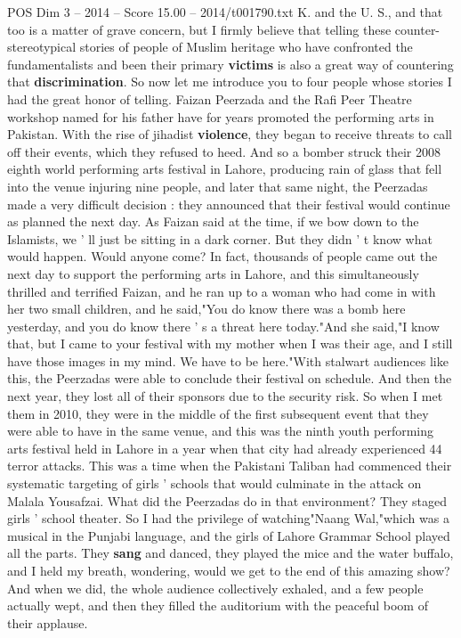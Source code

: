 \begin{textsample}{POS Dim 3 – 2014 – Score 15.00 – 2014/t001790.txt}
K. and the U.
S., and that too is a matter of grave concern, but I firmly believe that telling these counter- stereotypical stories of people of Muslim heritage who have confronted the fundamentalists and been their primary \textbf{victims} is also a great way of countering that \textbf{discrimination}.
So now let me introduce you to four people whose stories I had the great honor of telling.
Faizan Peerzada and the Rafi Peer Theatre workshop named for his father have for years promoted the performing arts in Pakistan.
With the rise of jihadist \textbf{violence}, they began to receive threats to call off their events, which they refused to heed.
And so a bomber struck their 2008 eighth world performing arts festival in Lahore, producing rain of glass that fell into the venue injuring nine people, and later that same night, the Peerzadas made a very difficult decision : they announced that their festival would continue as planned the next day.
As Faizan said at the time, if we bow down to the Islamists, we ' ll just be sitting in a dark corner.
But they didn ' t know what would happen.
Would anyone come?
In fact, thousands of people came out the next day to support the performing arts in Lahore, and this simultaneously thrilled and terrified Faizan, and he ran up to a woman who had come in with her two small children, and he said,"You do know there was a bomb here yesterday, and you do know there ' s a threat here today."And she said,"I know that, but I came to your festival with my mother when I was their age, and I still have those images in my mind.
We have to be here."With stalwart audiences like this, the Peerzadas were able to conclude their festival on schedule.
And then the next year, they lost all of their sponsors due to the security risk.
So when I met them in 2010, they were in the middle of the first subsequent event that they were able to have in the same venue, and this was the ninth youth performing arts festival held in Lahore in a year when that city had already experienced 44 terror attacks.
This was a time when the Pakistani Taliban had commenced their systematic targeting of girls ' schools that would culminate in the attack on Malala Yousafzai.
What did the Peerzadas do in that environment?
They staged girls ' school theater.
So I had the privilege of watching"Naang Wal,"which was a musical in the Punjabi language, and the girls of Lahore Grammar School played all the parts.
They \textbf{sang} and danced, they played the mice and the water buffalo, and I held my breath, wondering, would we get to the end of this amazing show?
And when we did, the whole audience collectively exhaled, and a few people actually wept, and then they filled the auditorium with the peaceful boom of their applause.

\end{textsample}
